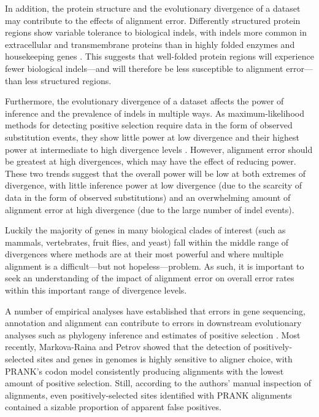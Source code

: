 In addition, the protein structure and the evolutionary divergence of
a dataset may contribute to the effects of alignment
error. Differently structured protein regions show variable tolerance
to biological indels, with indels more common in extracellular and
transmembrane proteins than in highly folded enzymes and housekeeping
genes \citep{delaChaux2007DNA}. This suggests that well-folded protein
regions will experience fewer biological indels---and will therefore
be less susceptible to alignment error---than less structured regions.

Furthermore, the evolutionary divergence of a dataset affects the
power of \sw inference and the prevalence of indels in multiple
ways. As maximum-likelihood methods for detecting positive selection
require data in the form of observed substitution events, they show
little power at low divergence and their highest power at intermediate
to high divergence levels \citep{Anisimova2001}. However,
alignment error should be greatest at high divergences, which may have
the effect of reducing power. These two trends suggest that the
overall power will be low at both extremes of divergence, with little
inference power at low divergence (due to the scarcity of data in the
form of observed substitutions) and an overwhelming amount of
alignment error at high divergence (due to the large number of indel
events).

Luckily the majority of genes in many biological clades of interest
(such as mammals, vertebrates, fruit flies, and yeast) fall within the
middle range of divergences where \sw methods are at their most
powerful and where multiple alignment is a difficult---but not
hopeless---problem. As such, it is important to seek an understanding
of the impact of alignment error on overall error rates within this
important range of divergence levels.

A number of empirical analyses have established that errors in gene
sequencing, annotation and alignment can contribute to errors in
downstream evolutionary analyses such as phylogeny inference
\citep{Wong2008Alignment} and estimates of positive selection
\citep{Schneider2009,Markova-Raina2011High}. Most recently,
Markova-Raina and Petrov \citeyearpar{Markova-Raina2011High} showed
that the detection of positively-selected sites and genes in \Dr
genomes is highly sensitive to aligner choice, with PRANK's codon
model \citep{Loytynoja2008PhylogenyAware} consistently producing
alignments with the lowest amount of positive selection. Still,
according to the authors' manual inspection of alignments, even
positively-selected sites identified with PRANK alignments contained a
sizable proportion of apparent false positives.

